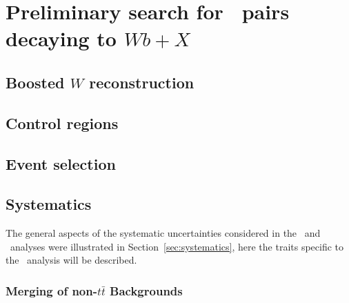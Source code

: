 \clearpage{\pagestyle{empty}\cleardoublepage}

\chapter{Preliminary search for \TTbar\ pairs decaying to $Wb+X$}\label{chap:wbx}

\section{Boosted $W$ reconstruction}\label{sec:boostedW}

\section{Control regions}\label{sec:wbxCR}

\section{Event selection}\label{sec:wbxEVT}



\section{Systematics}\label{sec:wbxSYS}

The general aspects of the systematic uncertainties considered
in the \wbx\ and \htx\ analyses were illustrated
in Section~\ref{sec:systematics}, here the traits specific to the
\wbx\ analysis will be described.

\subsection{Merging of non-$t\bar{t}$ Backgrounds}

